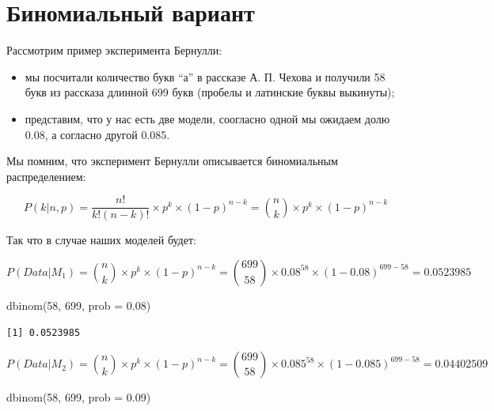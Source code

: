 \documentclass[
]{book}
\newenvironment{Shaded}{\begin{snugshade}}{\end{snugshade}}
\newcommand{\AttributeTok}[1]{\textcolor[rgb]{0.77,0.63,0.00}{#1}}
\newcommand{\DecValTok}[1]{\textcolor[rgb]{0.00,0.00,0.81}{#1}}
\newcommand{\FloatTok}[1]{\textcolor[rgb]{0.00,0.00,0.81}{#1}}
\newcommand{\FunctionTok}[1]{\textcolor[rgb]{0.00,0.00,0.00}{#1}}
\newcommand{\NormalTok}[1]{#1}
\providecommand{\tightlist}{%
  \setlength{\itemsep}{0pt}\setlength{\parskip}{0pt}}
\begin{document}
\hypertarget{ux431ux438ux43dux43eux43cux438ux430ux43bux44cux43dux44bux439-ux432ux430ux440ux438ux430ux43dux442}{%
\section{Биномиальный вариант}\label{ux431ux438ux43dux43eux43cux438ux430ux43bux44cux43dux44bux439-ux432ux430ux440ux438ux430ux43dux442}}

Рассмотрим пример эксперимента Бернулли:

\begin{itemize}
\tightlist
\item
  мы посчитали количество букв ``а'' в рассказе А. П. Чехова и получили 58 букв из рассказа длинной 699 букв (пробелы и латинские буквы выкинуты);
\item
  представим, что у нас есть две модели, соогласно одной мы ожидаем долю 0.08, а согласно другой 0.085.
\end{itemize}

Мы помним, что эксперимент Бернулли описывается биномиальным распределением:

\[P(k | n, p) = \frac{n!}{k!(n-k)!} \times p^k \times (1-p)^{n-k} =  {n \choose k} \times p^k \times (1-p)^{n-k}\]

Так что в случае наших моделей будет:

\[P(Data | M_1) = {n \choose k} \times p^k \times (1-p)^{n-k} = {699 \choose 58} \times 0.08^{58} \times (1-0.08)^{699-58} = 0.0523985\]

\begin{Shaded}
\begin{Highlighting}[]
\FunctionTok{dbinom}\NormalTok{(}\DecValTok{58}\NormalTok{, }\DecValTok{699}\NormalTok{, }\AttributeTok{prob =} \FloatTok{0.08}\NormalTok{)}
\end{Highlighting}
\end{Shaded}

\begin{verbatim}
[1] 0.0523985
\end{verbatim}

\[P(Data | M_2) = {n \choose k} \times p^k \times (1-p)^{n-k} = {699 \choose 58} \times 0.085^{58} \times (1-0.085)^{699-58} = 0.04402509\]

\begin{Shaded}
\begin{Highlighting}[]
\FunctionTok{dbinom}\NormalTok{(}\DecValTok{58}\NormalTok{, }\DecValTok{699}\NormalTok{, }\AttributeTok{prob =} \FloatTok{0.09}\NormalTok{)}
\end{Highlighting}
\end{Shaded}
\end{document}
